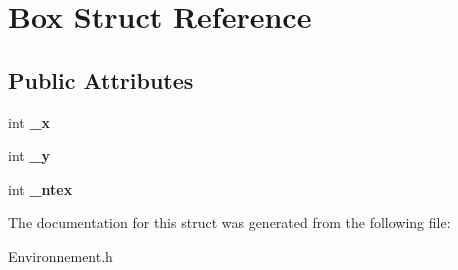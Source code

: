 \hypertarget{structBox}{}\section{Box Struct Reference}
\label{structBox}
\subsection*{Public Attributes}
\begin{DoxyCompactItemize}
\item 
\mbox{\label{structBox_afbde3ca4e6726ca731fc4e9bd72a7593}} 
int {\bfseries \+\_\+x}
\item 
\mbox{\label{structBox_ab94a931f8a78f844d8adca478de32f3a}} 
int {\bfseries \+\_\+y}
\item 
\mbox{\label{structBox_abf38f67df77d8a8e07d5f5e15120bf78}} 
int {\bfseries \+\_\+ntex}
\end{DoxyCompactItemize}


The documentation for this struct was generated from the following file\+:\begin{DoxyCompactItemize}
\item 
Environnement.\+h\end{DoxyCompactItemize}
